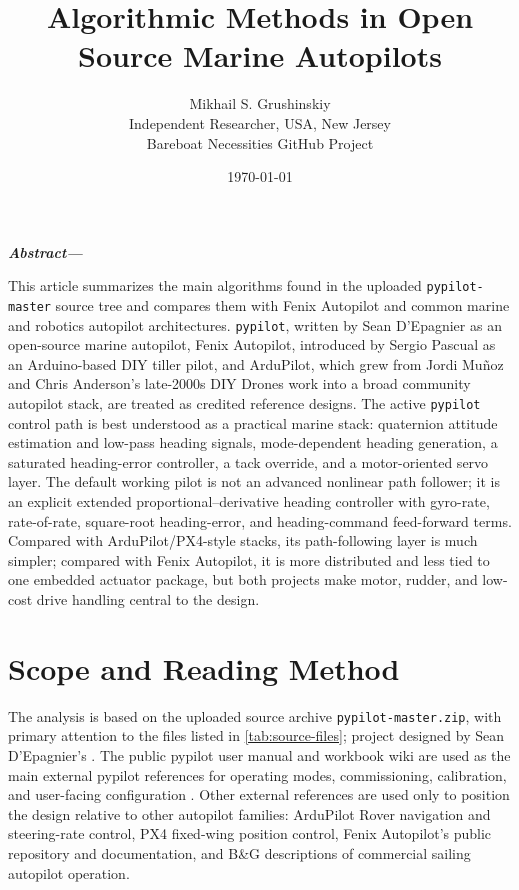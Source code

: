\documentclass[10pt,twocolumn]{article}
\title{Algorithmic Methods in Open Source Marine Autopilots}
\author{
Mikhail S. Grushinskiy\\
Independent Researcher, USA, New Jersey\\
Bareboat Necessities GitHub Project
}
\date{\today}
\makeatletter
\renewcommand{\maketitle}{%
  \twocolumn[{%
    \vspace*{-0.35in}
    \begin{center}
      {\normalfont\rmfamily\fontsize{24}{28}\selectfont\@title\par}
      \vspace{0.9em}
      {\normalfont\normalsize\rmfamily\@author\par}
      \ifx\@date\@empty
        \vspace{0.7em}
      \else
        \vspace{0.4em}
        {\normalfont\normalsize\rmfamily\@date\par}
        \vspace{0.7em}
      \fi
    \end{center}
  }]%
}
\renewenvironment{abstract}
  {%
    \par
    \small
    \bfseries
    \noindent
    \textit{Abstract---}%
    \ignorespaces
  }
  {%
    \par
    \vspace{0.7em}
  }
\makeatother
\begin{document}
\maketitle
\suppressfloats[t]

\begin{abstract}
This article summarizes the main algorithms found in the uploaded
\texttt{pypilot-master} source tree and compares them with Fenix Autopilot and common
marine and robotics autopilot architectures.  \texttt{pypilot}, written by
Sean D'Epagnier as an open-source marine autopilot, Fenix Autopilot, introduced by
Sergio Pascual as an Arduino-based DIY tiller pilot, and ArduPilot, which grew from
Jordi Mu\~noz and Chris Anderson's late-2000s DIY Drones work into a broad community
autopilot stack, are treated as credited reference designs.  The active
\texttt{pypilot} control path is best understood as a practical marine stack: quaternion attitude estimation and low-pass heading
signals, mode-dependent heading generation, a saturated heading-error controller,
a tack override, and a motor-oriented servo layer.  The default working pilot is not
an advanced nonlinear path follower; it is an explicit extended proportional--derivative
heading controller with gyro-rate, rate-of-rate, square-root heading-error, and
heading-command feed-forward terms.  Compared with ArduPilot/PX4-style stacks, its
path-following layer is much simpler; compared with Fenix Autopilot, it is more
distributed and less tied to one embedded actuator package, but both projects make
motor, rudder, and low-cost drive handling central to the design.
\end{abstract}

\section{Scope and Reading Method}

The analysis is based on the uploaded source archive \texttt{pypilot-master.zip},
with primary attention to the files listed in \cref{tab:source-files}; project designed
by Sean D'Epagnier's \cite{pypilot-author}.
The public pypilot user manual and workbook wiki are used as the main external
pypilot references for operating modes, commissioning, calibration, and user-facing
configuration \cite{pypilot-user-manual,pypilot-workbook-wiki}.  Other external
references are used only to position the design relative to other autopilot families:
ArduPilot Rover navigation and steering-rate control, PX4 fixed-wing position control,
Fenix Autopilot's public repository and documentation, and B\&G descriptions of
commercial sailing autopilot operation.
\end{document}
